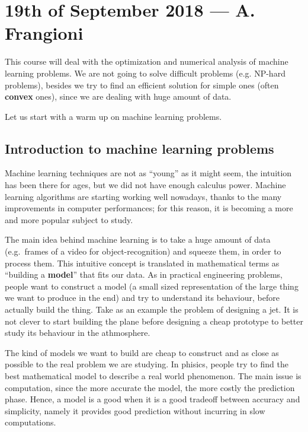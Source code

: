\documentclass[computationalMathematics.tex]{subfiles}
\begin{document}
\section{19th of September 2018 --- A. Frangioni}

This course will deal with the optimization and numerical analysis of machine learning problems.
We are not going to solve difficult problems (e.g. NP-hard problems), besides we try to find an efficient solution for simple ones (often \textbf{convex} ones), since we are dealing with huge amount of data.

Let us start with a warm up on machine learning problems.

\subsection{Introduction to machine learning problems}

Machine learning techniques are not as ``young'' as it might seem, the intuition has been there for ages, but we did not have enough calculus power.
Machine learning algorithms are starting working well nowadays, thanks to the many improvements in computer performances; for this reason, it is becoming a more and more popular subject to study.

The main idea behind machine learning is to take a huge amount of data (e.g.~frames of a video for object-recognition) and squeeze them, in order to process them.
This intuitive concept is translated in mathematical terms as ``building a \textbf{model}'' that fits our data.
As in practical engineering problems, people want to construct a model (a small sized representation of the large thing we want to produce in the end) and try to understand its behaviour, before actually build the thing.
Take as an example the problem of designing a jet.
It is not clever to start building the plane before designing a cheap prototype to better study its behaviour in the athmosphere.

The kind of models we want to build are cheap to construct and as close as possible to the real problem we are studying.
In phisics, people try to find the best mathematical model to describe a real world phenomenon.
The main issue is computation, since the more accurate the model, the more costly the prediction phase.
Hence, a model is a good when it is a good tradeoff between accuracy and simplicity, namely it provides good prediction without incurring in slow computations.
\end{document}
